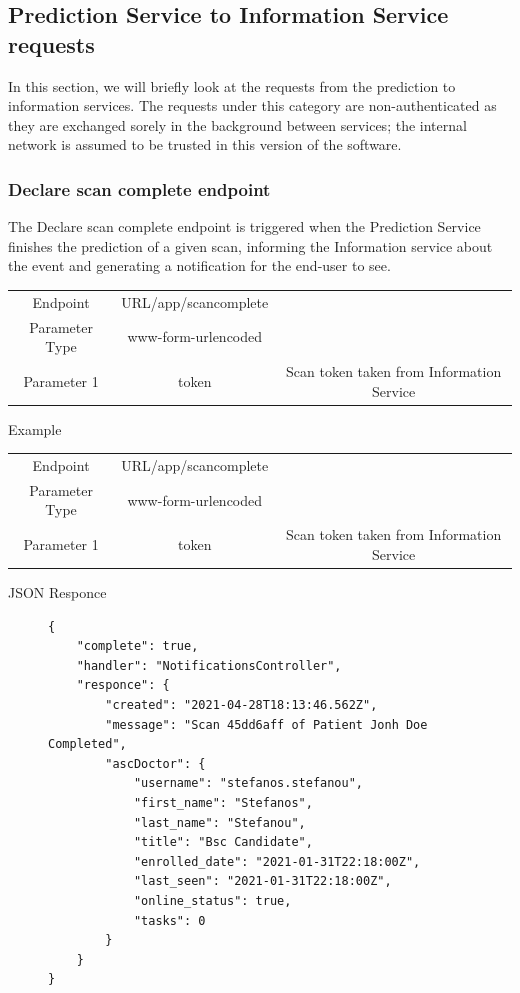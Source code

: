 			\subsection{Prediction Service to Information Service requests}
				In this section, we will briefly look at the requests from the prediction to information services. The requests under this category are non-authenticated 
				as they are exchanged sorely in the background between services; the internal network is assumed to be trusted in this version of the software.
				\subsubsection{Declare scan complete endpoint}
					\label{declare-scan-complete-endpoint}
					The Declare scan complete endpoint is triggered when the Prediction Service finishes the prediction of a given scan, informing 
					the Information service about the event and generating a notification for the end-user to see.
					\begin{center}
						\begin{tabular}{ |c|c|c| } 
							\hline
							Endpoint & {{URL}}/app/scancomplete& \\
							Parameter Type & www-form-urlencoded  &\\
							Parameter 1 & token  & Scan token taken from Information Service\\
							\hline
						\end{tabular}
					\end{center}
					Example
					\begin{center}
						\begin{tabular}{ |c|c|c| } 
							\hline
							Endpoint & {{URL}}/app/scancomplete& \\
							Parameter Type & www-form-urlencoded  &\\
							Parameter 1 & token  & Scan token taken from Information Service\\
							\hline
						\end{tabular}
					\end{center}
					JSON Responce
					\begin{figure}[H]
						\iftrue
						\begin{lstlisting}[]
{
	"complete": true,
	"handler": "NotificationsController",
	"responce": {
		"created": "2021-04-28T18:13:46.562Z",
		"message": "Scan 45dd6aff of Patient Jonh Doe Completed",
		"ascDoctor": {
			"username": "stefanos.stefanou",
			"first_name": "Stefanos",
			"last_name": "Stefanou",
			"title": "Bsc Candidate",
			"enrolled_date": "2021-01-31T22:18:00Z",
			"last_seen": "2021-01-31T22:18:00Z",
			"online_status": true,
			"tasks": 0
		}
	}
}
						\end{lstlisting}
					\end{figure}

